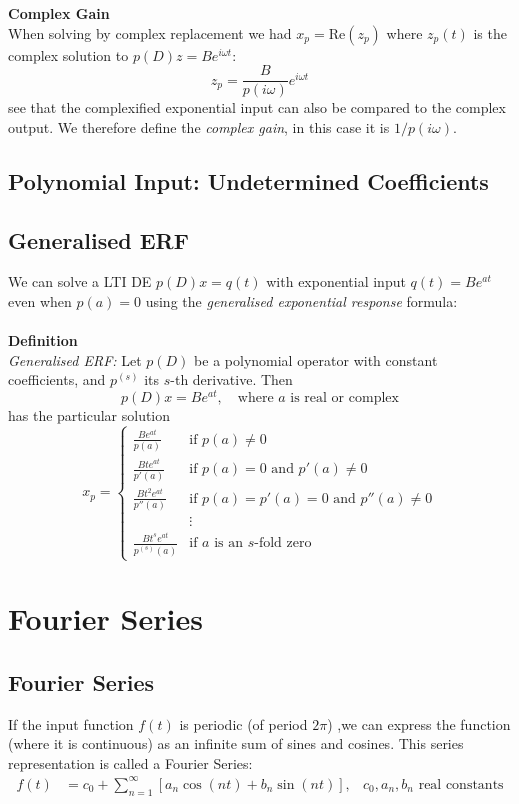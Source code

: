 \documentclass{report}
\begin{document}
\textbf{Complex Gain}\\
When solving by complex replacement we had $x_p=\text{Re}(z_p)$ where $z_p(t)$ is the complex solution
to $p(D)z=Be^{i\omega t}$:
\begin{equation*}
z_p=\frac{B}{p(i\omega)}e^{i\omega t}
\end{equation*}
see that the complexified exponential input can also be compared to the complex output. We therefore define the 
\textit{complex gain}, in this case it is $1/p(i\omega)$.
\newpage

\subsection{Polynomial Input: Undetermined Coefficients}






\newpage

\subsection{Generalised ERF}
We can solve a LTI DE $p(D)x=q(t)$ with exponential input 
$q(t)=Be^{at}$ even when $p(a)=0$ using the \textit{generalised exponential response} formula:\\
\vspace{1mm}\\
\textbf{Definition}\\
\textit{Generalised ERF:} Let $p(D)$ be a polynomial operator with constant coefficients, and $p^{(s)}$
its $s$-th derivative. Then
\begin{equation*}
p(D)x=Be^{at},\quad\text{where $a$ is real or complex}
\end{equation*}
has the particular solution 
\begin{equation*}
x_p=\begin{cases}
\frac{Be^{at}}{p(a)}&\text{if }p(a)\neq0\\
\frac{Bte^{at}}{p'(a)}&\text{if }p(a)=0\text{ and }p'(a)\neq0\\
\frac{Bt^2e^{at}}{p''(a)}&\text{if }p(a)=p'(a)=0\text{ and }p''(a)\neq0\\
&\vdots\\
\frac{Bt^se^{at}}{p^{(s)}(a)}&\text{if $a$ is an $s$-fold zero}
\end{cases}
\end{equation*}
\newpage



\section{Fourier Series}
\subsection{Fourier Series}
If the input function $f(t)$ is periodic (of period $2\pi$)
,we can express the function (where it is continuous) as an
infinite sum of sines and cosines.
This series representation is called a Fourier Series:
\begin{align*}
f(t)&=c_0+\sum_{n=1}^{\infty}[a_n\cos(nt)+b_n\sin(nt)], 
& \text{$c_0, a_n, b_n$ real constants}
\end{align*}
\end{document}
